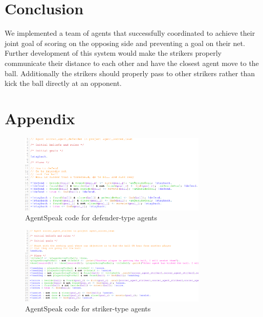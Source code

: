 \documentclass[conference]{IEEEtran}
\begin{document}
	\section{Conclusion}
	We implemented a team of agents that successfully coordinated to achieve their joint goal of scoring on the opposing side and preventing a goal on their net. Further development of this system would make the strikers properly communicate their distance to each other and have the closest agent move to the ball. Additionally the strikers should properly pass to other strikers rather than kick the ball directly at an opponent.
	
	
	\section{Appendix}
	\centering
	\begin{figure}[h]
		\centering
		\includegraphics[width=0.8\textwidth]{fig/defender-code.png}
		\caption{AgentSpeak code for defender-type agents}
		\label{code-defender}
	\end{figure}
	
	\begin{figure}[h]
		\centering
		\includegraphics[width=0.8\textwidth]{fig/striker-code.png}
		\caption{AgentSpeak code for striker-type agents}
		\label{code-striker}
	\end{figure}
	
	
\end{document}
